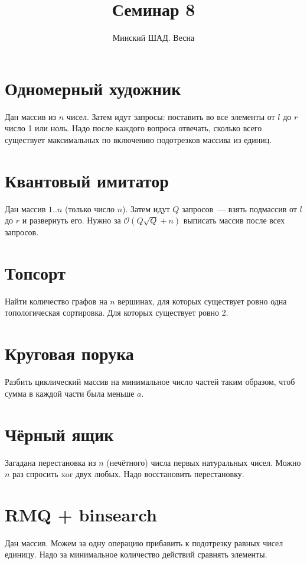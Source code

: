 \documentclass[addpoints]{exam}
\title{Семинар 8}
\author{Минский ШАД. Весна}
\begin{document}
\maketitle

\section{Одномерный художник}

Дан массив из $n$ чисел. Затем идут запросы: поставить во все элементы от $l$ до $r$ число 1 или ноль. Надо после каждого вопроса отвечать, сколько всего существует максимальных по включению подотрезков массива из единиц.

\section{Квантовый имитатор}

Дан массив $1..n$ (только число $n$). Затем идут $Q$ запросов~--- взять подмассив от $l$ до $r$ и развернуть его. Нужно за $\mathcal{O}(Q \sqrt{Q} + n)$ выписать массив после всех запросов.

\section{Топсорт}

Найти количество графов на $n$ вершинах, для которых существует ровно одна топологическая сортировка. Для которых существует ровно 2.

\section{Круговая порука}

Разбить циклический массив на минимальное число частей таким образом, чтоб сумма в каждой части была меньше $a$.

\section{Чёрный ящик}

Загадана перестановка из $n$ (нечётного) числа первых натуральных чисел. Можно $n$ раз спросить xor двух любых. Надо восстановить перестановку.

\section{RMQ + binsearch}

Дан массив. Можем за одну операцию прибавить к подотрезку равных чисел единицу. Надо за минимальное количество действий сравнять элементы.
\end{document}
